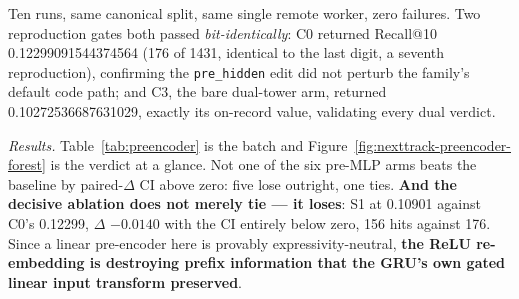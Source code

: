 \documentclass[11pt]{article}
\begin{document}
Ten runs, same canonical split, same single remote worker, zero failures. Two
reproduction gates both passed \emph{bit-identically}: C0 returned Recall@10
\num{0.12299091544374564} (\num{176} of \num{1431}, identical to the last digit,
a seventh reproduction), confirming the \texttt{pre\_hidden} edit did not perturb
the family's default code path; and C3, the bare dual-tower arm, returned
\num{0.10272536687631029}, exactly its on-record value, validating every dual
verdict.

\emph{Results.} Table~\ref{tab:preencoder} is the batch and
Figure~\ref{fig:nexttrack-preencoder-forest} is the verdict at a glance. Not one
of the six pre-MLP arms beats the baseline by paired-$\Delta$ CI above zero:
five lose outright, one ties. \textbf{And the decisive ablation does not merely
tie --- it loses}: S1 at \num{0.10901} against C0's \num{0.12299}, $\Delta$
$-\num{0.0140}$ with the CI entirely below zero, \num{156} hits against
\num{176}. Since a linear pre-encoder here is provably expressivity-neutral,
\textbf{the ReLU re-embedding is destroying prefix information that the GRU's own
gated linear input transform preserved}.
\end{document}

